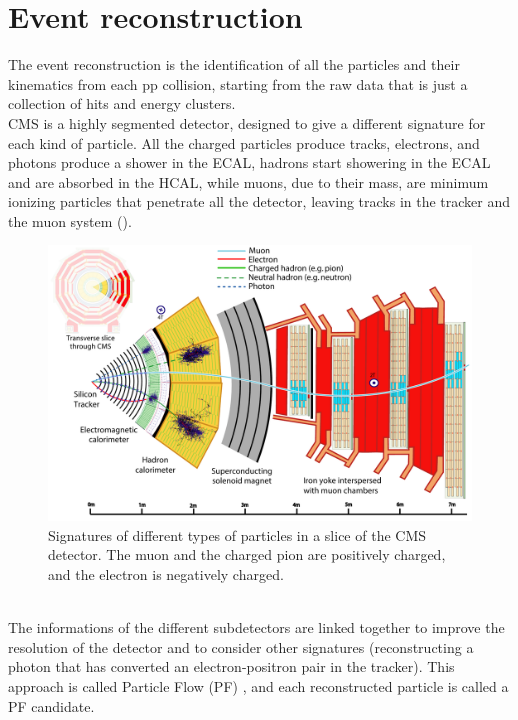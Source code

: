 
\label{sec:RECO}
\vspace{-1cm}
\minitoc

\section{Event reconstruction}\label{sec:PF}
The event reconstruction is the identification of all the particles and their kinematics from each pp collision, starting from the raw data that is just a collection of hits and energy clusters.\\
CMS is a highly segmented detector, designed to give a different signature for each kind of particle.
All the charged particles produce tracks, electrons, and photons produce a shower in the ECAL, hadrons start showering in the ECAL and are absorbed in the HCAL, while muons, due to their mass, are minimum ionizing particles that penetrate all the detector, leaving tracks in the tracker and the muon system ().
\begin{figure}[h!]
    \centering
    \includegraphics[width=\linewidth]{fig//chap04-reco/CMS_detector_PID_edit.pdf}
    \caption{Signatures of different types of particles in a slice of the CMS detector. The muon and the charged pion are positively charged, and the electron is negatively charged. \cite{Sirunyan2017Particle-flowDetector}}
    \label{fig:PF}
\end{figure}
\\
The informations of the different subdetectors are linked together to improve the resolution of the detector and to consider other signatures (\eg reconstructing a photon that has converted an electron-positron pair in the tracker).
This approach is called Particle Flow (PF) \cite{Sirunyan2017Particle-flowDetector}, and each reconstructed particle is called a PF candidate.



